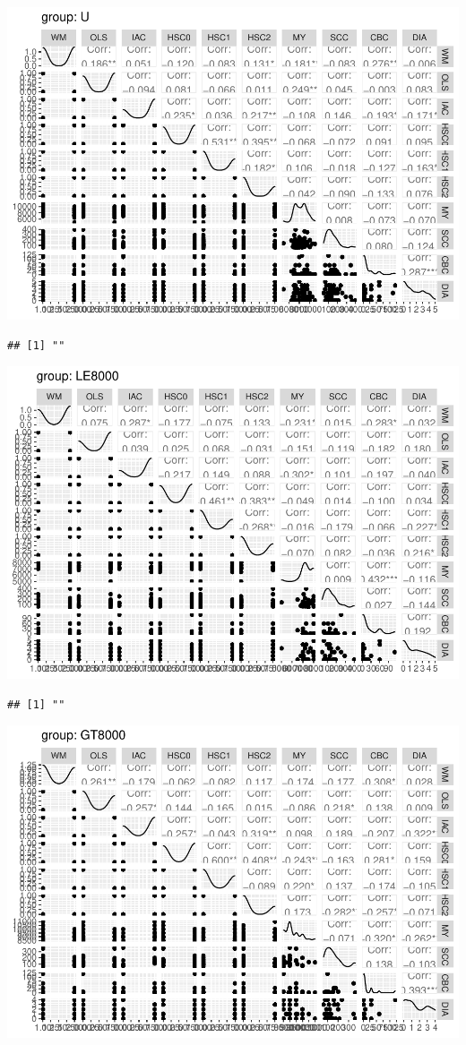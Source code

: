 \documentclass[
]{article}
\begin{document}
\includegraphics{IndependentVariables_files/figure-latex/unnamed-chunk-2-1.pdf}

\begin{verbatim}
## [1] ""
\end{verbatim}

\includegraphics{IndependentVariables_files/figure-latex/unnamed-chunk-2-2.pdf}

\begin{verbatim}
## [1] ""
\end{verbatim}

\includegraphics{IndependentVariables_files/figure-latex/unnamed-chunk-2-3.pdf}
\end{document}
